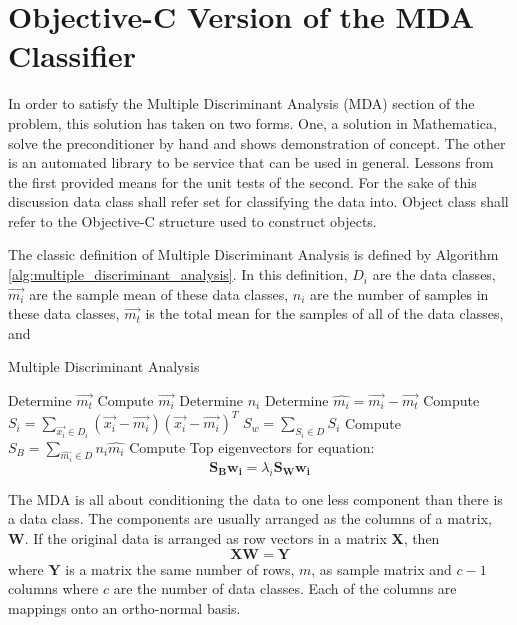 \section{Objective-C Version of the MDA Classifier}
In order to satisfy the Multiple Discriminant Analysis (MDA) section of the problem, this solution has taken on two forms.  One, a solution in Mathematica, solve the preconditioner by hand and shows demonstration of concept.  The other is an automated library to be service that can be used in general.  Lessons from the first provided means for the unit tests of the second.  For the sake of this discussion data class shall refer set for classifying the data into.  Object class shall refer to the Objective-C structure used to construct objects. 

The classic definition of Multiple Discriminant Analysis is defined by Algorithm \ref{alg:multiple_discriminant_analysis}.  In this definition, $D_i$ are the data classes, $\vec{m_i}$ are the sample mean of these data classes, $n_i$ are the number of samples in these data classes, $\vec{m_t}$ is the total mean for the samples of all of the data classes, and 

\begin{algorithm}
\caption{Multiple Discriminant Analysis}
\label{alg:multiple_discriminant_analysis}
\begin{algorithmic}
	\STATE Determine $\vec{m_t}$
		\STATE Compute $\vec{m_i}$
		\STATE Determine $n_i$
		\STATE Determine $\hat{m_i} = \vec{m_i} - \vec{m_t}$
		\STATE Compute $S_i = \sum_{\vec{x_i} \in D_i} (\vec{x_i} - \vec{m_i} )(\vec{x_i} - \vec{m_i} )^T $
	\ENDFOR
	\STATE $S_w = \sum _{S_i \in D} S_i$
	\STATE Compute $S_B = \sum_{\hat{m_i} \in D} n_i \hat{m_i}$
	\STATE Compute Top eigenvectors for equation: 
	\[
	\mathbf{S_B} \mathbf{w_i} = \lambda_i \mathbf{S_W} \mathbf{w_i}
	\]
\end{algorithmic}
\end{algorithm}


The MDA is all about conditioning the data to one less component than there is a data class.  The components are usually arranged as the columns of a matrix, $\mathbf{W}$.  If the original data is arranged as row vectors in a matrix $\mathbf{X}$, then
\begin{equation}
\mathbf{XW} = \mathbf{Y}
\end{equation}
where $\mathbf{Y}$ is a matrix the same number of rows, $m$, as sample matrix and $c-1$ columns where $c$ are the number of data classes.  Each of the columns are mappings onto an ortho-normal basis.  

